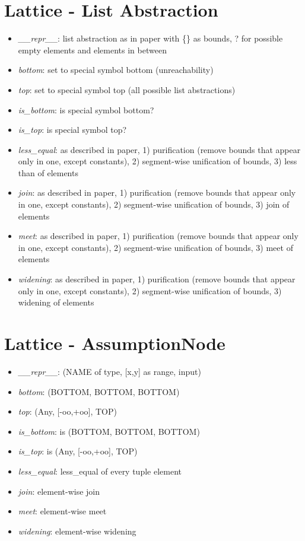 \documentclass[11pt]{article}
\begin{document}
\section{Lattice - List Abstraction}

\begin{itemize}
\item \textit{\_\_repr\_\_}: list abstraction as in paper with \{\} as bounds, ? for possible empty elements and elements in between
\item \textit{bottom}: set to special symbol bottom (unreachability)
\item \textit{top}: set to special symbol top (all possible list abstractions)
\item \textit{is\_bottom}: is special symbol bottom?
\item \textit{is\_top}: is special symbol top?
\item \textit{less\_equal}: as described in paper, 1) purification (remove bounds that appear only in one, except constants), 2) segment-wise unification of bounds, 3) less than of elements
\item \textit{join}: as described in paper, 1) purification (remove bounds that appear only in one, except constants), 2) segment-wise unification of bounds, 3) join of elements
\item \textit{meet}: as described in paper, 1) purification (remove bounds that appear only in one, except constants), 2) segment-wise unification of bounds, 3) meet of elements
\item \textit{widening}: as described in paper, 1) purification (remove bounds that appear only in one, except constants), 2) segment-wise unification of bounds, 3) widening of elements
\end{itemize}

\section{Lattice - AssumptionNode}

\begin{itemize}
\item \textit{\_\_repr\_\_}: (NAME of type, [x,y] as range, input)
\item \textit{bottom}: (BOTTOM, BOTTOM, BOTTOM)
\item \textit{top}: (Any, [-oo,+oo], TOP)
\item \textit{is\_bottom}: is (BOTTOM, BOTTOM, BOTTOM)
\item \textit{is\_top}: is (Any, [-oo,+oo], TOP)
\item \textit{less\_equal}: less\_equal of every tuple element
\item \textit{join}: element-wise join
\item \textit{meet}: element-wise meet
\item \textit{widening}: element-wise widening
\end{itemize}
\end{document}
